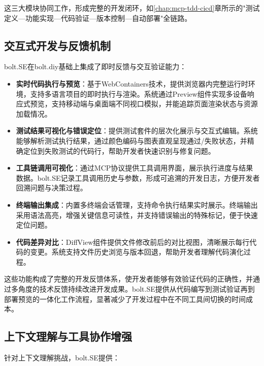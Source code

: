 这三大模块协同工作，形成完整的开发闭环，如\ref{chap:mcp-tdd-cicd}章所示的"测试定义—功能实现—代码验证—版本控制—自动部署"全链路。

\subsection{交互式开发与反馈机制}

bolt.SE在bolt.diy基础上集成了即时反馈与交互验证能力：

\begin{itemize}
    \item \textbf{实时代码执行与预览}：基于WebContainers技术，提供浏览器内完整运行时环境，支持多语言项目的即时执行与渲染。系统通过Preview组件实现多设备响应式预览，支持移动端与桌面端不同视口模拟，并能追踪页面渲染状态与资源加载情况。
    
    \item \textbf{测试结果可视化与错误定位}：提供测试套件的层次化展示与交互式编辑。系统能够解析测试执行结果，通过颜色编码与图表直观呈现通过/失败状态，并精确定位到失败测试的代码行，帮助开发者快速识别与修复问题。
          
    \item \textbf{工具链调用可视化}：通过MCP协议提供工具调用界面，展示执行进度与结果数据。bolt.SE记录工具调用历史与参数，形成可追溯的开发日志，方便开发者回溯问题与决策过程。
    
    \item \textbf{终端输出集成}：内置多终端会话管理，支持命令执行结果实时展示。终端输出采用语法高亮，增强关键信息可读性，并支持错误输出的特殊标记，便于快速定位问题。
    
    \item \textbf{代码差异对比}：DiffView组件提供文件修改前后的对比视图，清晰展示每行代码的变更。系统支持文件历史浏览与版本回退，帮助开发者理解代码演化过程。
\end{itemize}

这些功能构成了完整的开发反馈体系，使开发者能够有效验证代码的正确性，并通过多角度的技术反馈持续改进开发成果。bolt.SE提供从代码编写到测试验证再到部署预览的一体化工作流程，显著减少了开发过程中在不同工具间切换的时间成本。

\subsection{上下文理解与工具协作增强}

针对上下文理解挑战，bolt.SE提供：


